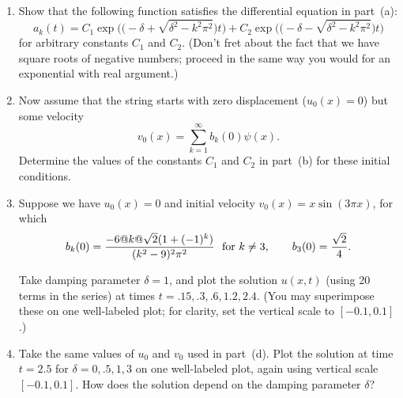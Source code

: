 \documentclass[10pt]{article}
\begin{document}
\begin{enumerate}
\begin{enumerate}
\item Show that the following function satisfies the differential equation in part~(a):
\[ a_k(t) = C_1 \exp\!\big(\big(-\!\delta+\sqrt{\delta^2-k^2\pi^2}\big)t\big)
            + C_2 \exp\!\big(\big(-\!\delta-\sqrt{\delta^2-k^2\pi^2}\big)t\big)\]
      for arbitrary constants $C_1$ and $C_2$.  (Don't fret about the fact that we
      have square roots of negative numbers; proceed in the same way you 
      would for an exponential with real argument.)

\item Now assume that the string starts with zero displacement
      ($u_0(x) = 0$) but some velocity 
     \[ v_0(x) = \sum_{k=1}^\infty b_k(0)  \psi(x).\]
      Determine the values of the constants $C_1$ and $C_2$ in part~(b)
      for these initial conditions. 

\item Suppose we have $u_0(x)=0$ and initial velocity 
      $v_0(x) = x \sin(3\pi x)$, for which
      \[ b_k(0) = {-6@k@\sqrt{2} (1+(-1)^k) \over (k^2 -9)^2 \pi^2} \mbox{\ \ for $k\ne 3$}, 
    \qquad b_3(0) = {\sqrt{2}\over 4}.\]

      Take damping parameter $\delta=1$, and plot the solution $u(x,t)$ 
      (using 20 terms in the series) at times $t=.15, .3, .6, 1.2, 2.4$.  
      (You may superimpose these on one well-labeled plot; for clarity,
      set the vertical scale to $[-0.1,0.1]$.)

\item Take the same values of $u_0$ and $v_0$ used in part~(d).
      Plot the solution at time $t=2.5$ for $\delta = 0, .5, 1, 3$
      on one well-labeled plot, again using vertical scale $[-0.1,0.1]$.
      How does the solution depend on the damping parameter $\delta$?
\end{enumerate}


\end{enumerate}
\end{document}
